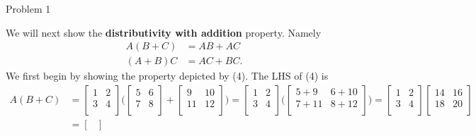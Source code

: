 \begin{problem}{Problem 1}
\begin{highlight}[Solution]
        We will next show the \textbf{distributivity with addition} property. Namely
        \begin{align}
            A(B + C) & = AB + AC \\
            (A + B)C & = AC + BC.
        \end{align}
        We first begin by showing the property depicted by (4). The LHS of (4) is
        \begin{align*}
            A(B + C) & = 
            \begin{bmatrix}
                1 & 2 \\
                3 & 4 \\
            \end{bmatrix}
            \Bigg(
                \begin{bmatrix}
                    5 & 6 \\
                    7 & 8 \\
                \end{bmatrix}
                + 
                \begin{bmatrix}
                    9 & 10 \\
                    11 & 12 \\
                \end{bmatrix}
            \Bigg)
            = 
            \begin{bmatrix}
                1 & 2 \\
                3 & 4 \\
            \end{bmatrix}
            \Bigg(
                \begin{bmatrix}
                    5 + 9 & 6 + 10 \\
                    7 + 11 & 8 + 12 \\
                \end{bmatrix}
            \Bigg)
            = 
            \begin{bmatrix}
                1 & 2 \\
                3 & 4 \\
            \end{bmatrix}
            \begin{bmatrix}
                14 & 16 \\
                18 & 20 \\
            \end{bmatrix} \\
            & = 
            \begin{bmatrix}

\end{bmatrix}
\end{align*}
\end{highlight}
\end{problem}
